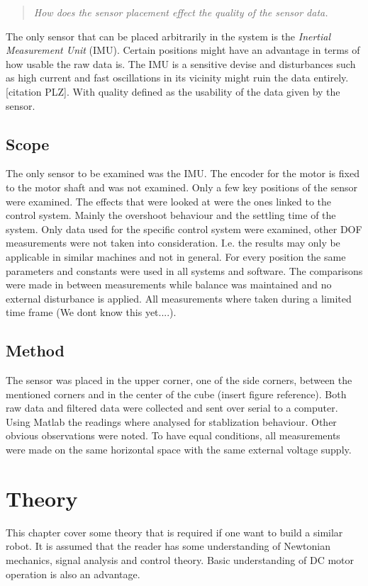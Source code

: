 \documentclass[a4paper,11pt]{kth-mag}
\newenvironment{italicquotes}
{\begin{quote}\itshape}
{\end{quote}}
\begin{document}
\begin{italicquotes}
How does the sensor placement effect the quality of the sensor data.
\end{italicquotes}
The only sensor that can be placed arbitrarily in the system is the \textit{Inertial Measurement Unit} (IMU). Certain positions might have an advantage in terms of how usable the raw data is. The IMU is a sensitive devise and disturbances such as high current and fast oscillations in its vicinity might ruin the data entirely.[citation PLZ]. With quality defined as the usability of the data given by the sensor.

\section{Scope}
The only sensor to be examined was the IMU. The encoder for the motor is fixed to the motor shaft and was not examined. Only a few key positions of the sensor were examined.
The effects that were looked at were the ones linked to the control system. Mainly the overshoot behaviour and the settling time of the system. Only data used for the specific control system were examined, other DOF measurements were not taken into consideration. I.e. the results may only be applicable in similar machines and not in general.
For every position the same parameters and constants were used in all systems and software. The comparisons were made in between measurements while balance was maintained and no external disturbance is applied. All measurements where taken during a limited time frame (We dont know this yet....). 

\section{Method}
The sensor was placed in the upper corner, one of the side corners, between the mentioned corners and in the center of the cube (insert figure reference). Both raw data and filtered data were collected and sent over serial to a computer. Using Matlab \cite{MATLAB:2014} the readings where analysed for stablization behaviour. Other obvious observations were noted. To have equal conditions, all measurements were made on the same horizontal space with the same external voltage supply.

\chapter{Theory}
This chapter cover some theory that is required if one want to build a similar robot. It is assumed that the reader has some understanding of Newtonian mechanics, signal analysis and control theory. Basic understanding of DC motor operation is also an advantage.
\end{document}

